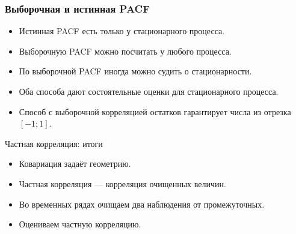 \begin{frame}
  \frametitle{Выборочная и истинная PACF}
  \begin{itemize}[<+->]
    \item Истинная PACF есть \alert{только у стационарного} процесса. 
    \item Выборочную PACF можно посчитать \alert{у любого} процесса. 
    \item По выборочной PACF иногда \alert{можно судить} о стационарности. 
    \item Оба способа дают состоятельные оценки для стационарного процесса. 
    \item Способ с выборочной корреляцией остатков гарантирует числа из отрезка $[-1;1]$.
  \end{itemize}

\end{frame}

\begin{frame}{Частная корреляция: итоги}

  \begin{itemize}[<+->]
    \item Ковариация задаёт геометрию. 
    \item Частная корреляция — корреляция \alert{очищенных} величин.
    \item Во временных рядах очищаем два наблюдения от \alert{промежуточных}.
    \item Оцениваем частную корреляцию.
  \end{itemize}
\end{frame}



